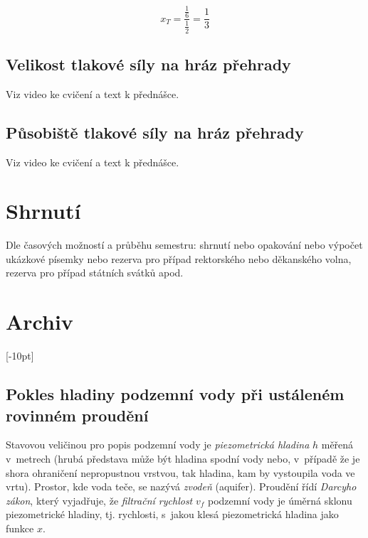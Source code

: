 $$x_T=\frac{\frac 16}{\frac 12}=\frac 13$$

\konec 




\subsection{Velikost tlakové síly na hráz přehrady}

Viz video ke cvičení a text k přednášce.

\subsection{Působiště tlakové síly na hráz přehrady}

Viz video ke cvičení a text k přednášce.



\stranka
\section{Shrnutí}

Dle časových možností a průběhu semestru: shrnutí nebo opakování nebo výpočet ukázkové písemky nebo rezerva pro případ rektorského nebo děkanského volna, rezerva pro případ státních svátků apod.




\stranka


\section{Archiv}

\stranka
{}[-10pt]


\subsection{Pokles hladiny podzemní vody při ustáleném rovinném proudění}

\label{pokles}
Stavovou veličinou pro popis podzemní vody je \textit{piezometrická
  hladina} $h$ měřená v metrech (hrubá představa může být hladina
spodní vody nebo, v případě že je shora ohraničení nepropustnou
vrstvou, tak hladina, kam by vystoupila voda ve vrtu). Prostor, kde
voda teče, se nazývá \textit{zvodeň} (aquifer).
Proudění řídí \textit{Darcyho zákon}, který
  vyjadřuje, že \textit{filtrační rychlost} $v_f$ podzemní vody je úměrná
  sklonu piezometrické hladiny, tj. rychlosti, s jakou klesá
  piezometrická hladina jako funkce $x$.

